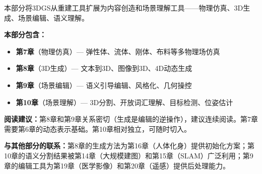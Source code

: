 \vspace{1em}
\begin{center}
\textcolor{techgray}{\small 本部分将3DGS从重建工具扩展为内容创造和场景理解工具——物理仿真、3D生成、场景编辑、语义理解。}
\end{center}
\vspace{0.5em}

\noindent\textbf{本部分包含：}
\begin{itemize}[leftmargin=2em,itemsep=1pt]
\item[\textcolor{techorange}{\textbullet}] \textbf{第7章}（物理仿真）— 弹性体、流体、刚体、布料等多物理场仿真
\item[\textcolor{techorange}{\textbullet}] \textbf{第8章}（3D生成）— 文本到3D、图像到3D、4D动态生成
\item[\textcolor{techorange}{\textbullet}] \textbf{第9章}（场景编辑）— 语义引导编辑、风格化、几何操控
\item[\textcolor{techorange}{\textbullet}] \textbf{第10章}（场景理解）— 3D分割、开放词汇理解、目标检测、位姿估计
\end{itemize}

\noindent\textbf{阅读建议：}第8章和第9章关系密切（生成是编辑的逆操作），建议连续阅读。第7章需要第6章的动态表示基础。第10章相对独立，可随时切入。

\noindent\textbf{与其他部分的联系：}第8章的生成方法为第16章（人体化身）提供初始化方案；第10章的语义分割结果被第14章（大规模建图）和第15章（SLAM）广泛利用；第9章的编辑工具为第19章（医学影像）和第20章（遥感）提供后处理能力。

\vspace{1em}
